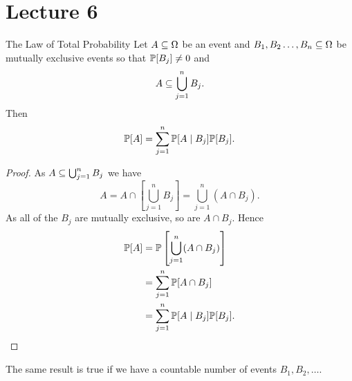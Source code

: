\documentclass[class=article, crop=false]{standalone}
\begin{document}
  \section{Lecture 6}
  \begin{theorem}{The Law of Total Probability}
    Let $A\sse \Omega$ be an event and $B_1,B_2\dotsc,B_n\sse \Omega$ be mutually exclusive events so that $\P[B_j]\neq 0$ and
    \[
      A\sse \bigcup_{j = 1}^n B_j.
    \]
    Then
    \[
      \P[A] = \sum_{j=1}^{n}\P[A\mid B_j]\P[B_j].
    \]
    \begin{proof}
      As $A\sse \bigcup_{j = 1}^n B_j$ we have
      \[
        A = A\cap \left[\bigcup_{j = 1}^n B_j\right] = \bigcup_{j = 1}^n (A\cap B_j).
      \]
      As all of the $B_j$ are mutually exclusive, so are $A\cap B_j$. Hence
      \begin{align*}
        \P[A] &= \P\left[\bigcup_{j = 1}^n (A\cap B_j)\right] \\
              &= \sum_{j=1}^{n}\P[A\cap B_j] \\
              &= \sum_{j=1}^{n}\P[A\mid B_j]\P[B_j].
      \end{align*}
    \end{proof}
  \end{theorem}
  \begin{note}{}
    The same result is true if we have a countable number of events $B_1, B_2,\dotsc$.
  \end{note}
\end{document}
